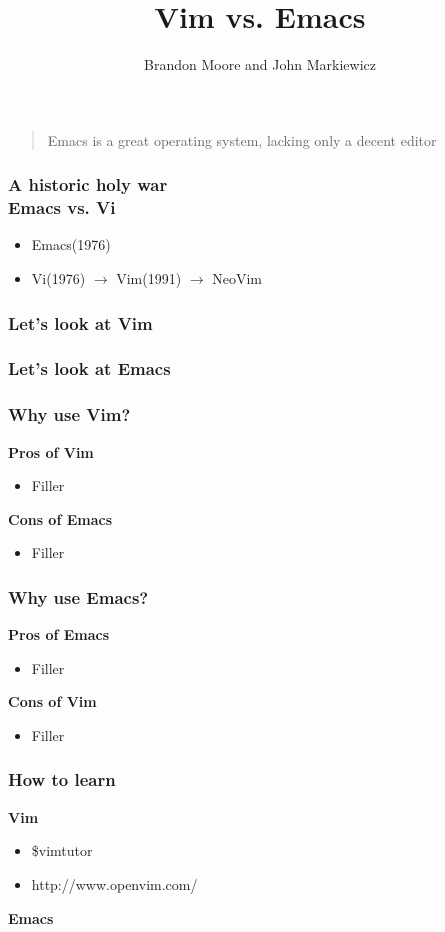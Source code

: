 \documentclass[8pt]{beamer}
\title{Vim vs. Emacs}
\author{Brandon Moore and John Markiewicz}
\date{}
\begin{document}
\begin{frame}
	\titlepage
\end{frame}

\begin{frame}
	\begin{quote}
		Emacs is a great operating system, lacking only a decent editor
	\end{quote}
\end{frame}

\begin{frame}
\end{frame}

\begin{frame}
	\frametitle{A historic holy war\\Emacs vs. Vi}
	\begin{itemize}
		\item Emacs(1976)
		\item Vi(1976) $\rightarrow$ Vim(1991) $\rightarrow$ NeoVim
	\end{itemize}
\end{frame}

\begin{frame}
	\frametitle{Let's look at Vim}
\end{frame}

\begin{frame}
	\frametitle{Let's look at Emacs}
\end{frame}

\begin{frame}
	\frametitle{Why use Vim?}
	\begin{multicols}{2}
		\textbf{Pros of Vim}
		\begin{itemize}
			\item Filler
		\end{itemize}
		\columnbreak
		\textbf{Cons of Emacs}
		\begin{itemize}
			\item Filler
		\end{itemize}
	\end{multicols}
\end{frame}

\begin{frame}
	\frametitle{Why use Emacs?}
	\begin{multicols}{2}
		\textbf{Pros of Emacs}
		\begin{itemize}
			\item Filler
		\end{itemize}
		\columnbreak
		\textbf{Cons of Vim}
		\begin{itemize}
			\item Filler
		\end{itemize}
	\end{multicols}
\end{frame}

\begin{frame}
	\frametitle{How to learn}
	\textbf{Vim}
	\begin{itemize}
		\item \$vimtutor
		\item http://www.openvim.com/
	\end{itemize}
	\textbf{Emacs}
\end{frame}
\end{document}
